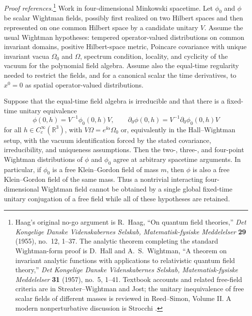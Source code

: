 \begin{quotedtheorem}
\label{qt:haag-hall-wightman-fixed-time-obstruction}
\emph{Proof references.}\footnote{Haag's original no-go argument is
R.~Haag, ``On quantum field theories,'' \emph{Det Kongelige Danske
Videnskabernes Selskab, Matematisk-fysiske Meddelelser} \textbf{29}
(1955), no.~12, 1--37.  The analytic theorem completing the standard
Wightman-form proof is D.~Hall and A.~S.~Wightman, ``A theorem on invariant
analytic functions with applications to relativistic quantum field theory,''
\emph{Det Kongelige Danske Videnskabernes Selskab, Matematisk-fysiske
Meddelelser} \textbf{31} (1957), no.~5, 1--41.  Textbook accounts and related
free-field criteria are in Streater--Wightman and Jost; the unitary
inequivalence of free scalar fields of different masses is reviewed in
Reed--Simon, Volume II.  A modern nonperturbative discussion is Strocchi
\cite{Haag1955,HallWightman1957,StreaterWightman1964,Jost1965,
ReehSchlieder1961,ReedSimon1975II,Strocchi2013NonPerturbative}.}
Work in four-dimensional Minkowski spacetime.  Let \(\phi_0\) and \(\phi\) be
scalar Wightman fields, possibly first realized on two Hilbert spaces and then
represented on one common Hilbert space by a candidate unitary \(V\).  Assume
the usual Wightman hypotheses:
tempered operator-valued distributions on common invariant domains, positive
Hilbert-space metric, Poincare covariance with unique invariant vacua
\(\Omega_0\) and \(\Omega\), spectrum condition, locality, and cyclicity of the
vacuum for the polynomial field algebra.  Assume also the equal-time
regularity needed to restrict the fields, and for a canonical scalar the
time derivatives, to \(x^0=0\) as spatial operator-valued distributions.

Suppose that the equal-time field algebra is irreducible and that there is a
fixed-time unitary equivalence
\[
  \phi(0,h)=V^{-1}\phi_0(0,h)V,\qquad
  \partial_0\phi(0,h)
  =
  V^{-1}\partial_0\phi_0(0,h)V
\]
for all \(h\in C_c^\infty(\mathbb R^3)\), with
\(V\Omega=e^{\ii\alpha}\Omega_0\)
or, equivalently in the Hall--Wightman setup, with the vacuum identification
forced by the stated covariance, irreducibility, and uniqueness assumptions.
Then the two-, three-, and four-point Wightman distributions of \(\phi\) and
\(\phi_0\) agree at arbitrary spacetime arguments.  In particular, if
\(\phi_0\) is a free Klein--Gordon field of mass \(m\), then \(\phi\) is also a
free Klein--Gordon field of the same mass.  Thus a nontrivial interacting
four-dimensional Wightman field cannot be obtained by a single global
fixed-time unitary conjugation of a free field while all of these hypotheses are
retained.
\end{quotedtheorem}

